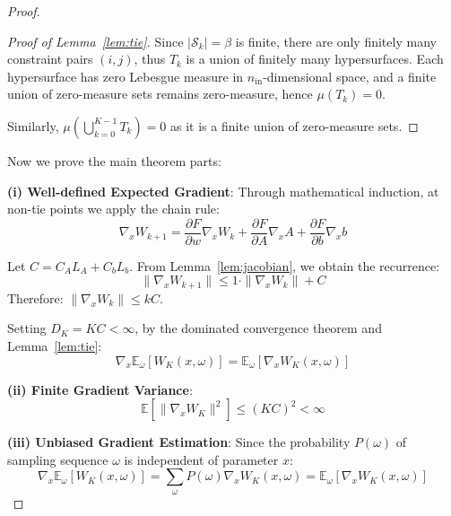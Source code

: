 \documentclass[10pt,a4paper]{amsart}
\begin{document}
\begin{proof}
\begin{proof}[Proof of Lemma~\ref{lem:tie}]
Since $|\mathcal{S}_k| = \beta$ is finite, there are only finitely many constraint pairs $(i,j)$, thus $T_k$ is a union of finitely many hypersurfaces. Each hypersurface has zero Lebesgue measure in $n_{\text{in}}$-dimensional space, and a finite union of zero-measure sets remains zero-measure, hence $\mu(T_k) = 0$.

Similarly, $\mu(\bigcup_{k=0}^{K-1} T_k) = 0$ as it is a finite union of zero-measure sets.
\end{proof}

Now we prove the main theorem parts:

\textbf{(i) Well-defined Expected Gradient}: 
Through mathematical induction, at non-tie points we apply the chain rule:
$$\nabla_x W_{k+1} = \frac{\partial F}{\partial w}\nabla_x W_k + \frac{\partial F}{\partial A}\nabla_x A + \frac{\partial F}{\partial b}\nabla_x b$$

Let $C = C_A L_A + C_b L_b$. From Lemma~\ref{lem:jacobian}, we obtain the recurrence:
$$\|\nabla_x W_{k+1}\| \leq 1 \cdot \|\nabla_x W_k\| + C$$
Therefore: $\|\nabla_x W_k\| \leq kC$.

Setting $D_K = KC < \infty$, by the dominated convergence theorem and Lemma~\ref{lem:tie}:
$$\nabla_x \mathbb{E}_\omega[W_K(x,\omega)] = \mathbb{E}_\omega[\nabla_x W_K(x,\omega)]$$

\textbf{(ii) Finite Gradient Variance}: 
$$\mathbb{E}[\|\nabla_x W_K\|^2] \leq (KC)^2 < \infty$$

\textbf{(iii) Unbiased Gradient Estimation}: Since the probability $P(\omega)$ of sampling sequence $\omega$ is independent of parameter $x$:
$$\nabla_x \mathbb{E}_\omega[W_K(x,\omega)] = \sum_\omega P(\omega) \nabla_x W_K(x,\omega) = \mathbb{E}_\omega[\nabla_x W_K(x,\omega)]$$
\end{proof}
\end{document}
